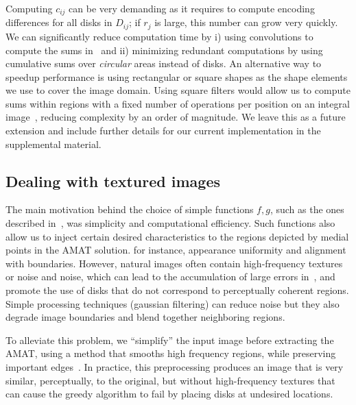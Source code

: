 \documentclass[10pt,twocolumn,letterpaper]{article}
\begin{document}
Computing $c_{ij}$ can be very demanding as it requires to compute encoding differences for all 
disks in $D_{ij}$; if $r_j$ is large, this number can grow very quickly.
We can significantly reduce computation time by i) using convolutions to compute the sums in~
and ii) minimizing redundant computations by using cumulative sums over \emph{circular} areas instead of disks.
An alternative way to speedup performance is using rectangular or square shapes as the
shape elements we use to cover the image domain.
Using square filters would allow us to compute sums within regions with a fixed number of operations per position on an integral
image~\cite{viola2001rapid,arbelaez2011contour}, reducing complexity by an order of magnitude.
We leave this as a future extension and include further details for our current implementation in the supplemental material.


\subsection{Dealing with textured images}\label{sec:implementation:texture}
The main motivation behind the choice of simple functions $f,g$, such as the ones described in~, was simplicity and 
computational efficiency.
Such functions also allow us to inject certain desired characteristics to the regions depicted by medial points in the AMAT solution.
for instance, appearance uniformity and alignment with boundaries.
However, natural images often contain high-frequency textures or noise and noise, which can lead to the accumulation of large errors 
in~, and promote the use of disks that do not correspond to perceptually coherent regions. 
Simple processing techniques (\eg gaussian filtering) can reduce noise but they also degrade image boundaries and
blend together neighboring regions.

To alleviate this problem, we ``simplify'' the input image before extracting the AMAT, using a method that smooths high frequency
regions, while preserving important edges~\cite{xu2011image}.
In practice, this preprocessing produces an image that is very similar, perceptually, to the original, 
but without high-frequency textures that can cause the greedy algorithm to fail by placing disks at undesired locations.
\end{document}
